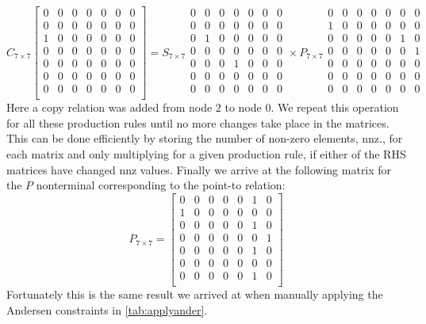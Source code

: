 \[
    C_{7\times 7}
    \begin{bmatrix}
        0 & 0 & 0 & 0 & 0 & 0 & 0 \\
        0 & 0 & 0 & 0 & 0 & 0 & 0 \\
        1 & 0 & 0 & 0 & 0 & 0 & 0 \\
        0 & 0 & 0 & 0 & 0 & 0 & 0 \\
        0 & 0 & 0 & 0 & 0 & 0 & 0 \\
        0 & 0 & 0 & 0 & 0 & 0 & 0 \\
        0 & 0 & 0 & 0 & 0 & 0 & 0 \\
    \end{bmatrix}
    =
    S_{7\times 7}
    \begin{smallmatrix}
        0 & 0 & 0 & 0 & 0 & 0 & 0 \\
        0 & 0 & 0 & 0 & 0 & 0 & 0 \\
        0 & 1 & 0 & 0 & 0 & 0 & 0 \\
        0 & 0 & 0 & 0 & 0 & 0 & 0 \\
        0 & 0 & 0 & 1 & 0 & 0 & 0 \\
        0 & 0 & 0 & 0 & 0 & 0 & 0 \\
        0 & 0 & 0 & 0 & 0 & 0 & 0 \\
    \end{smallmatrix}
    \times
    P_{7\times 7}
    \begin{smallmatrix}
        0 & 0 & 0 & 0 & 0 & 0 & 0 \\
        1 & 0 & 0 & 0 & 0 & 0 & 0 \\
        0 & 0 & 0 & 0 & 0 & 1 & 0 \\
        0 & 0 & 0 & 0 & 0 & 0 & 1 \\
        0 & 0 & 0 & 0 & 0 & 0 & 0 \\
        0 & 0 & 0 & 0 & 0 & 0 & 0 \\
        0 & 0 & 0 & 0 & 0 & 0 & 0 \\
    \end{smallmatrix}
\]
Here a copy relation was added from node $2$ to node $0$.
We repeat this operation for all these production rules until no more changes take place in the matrices.
This can be done efficiently by storing the number of non-zero elements, nnz., for each matrix and only multiplying for a given production rule, if either of the RHS matrices have changed nnz values.
Finally we arrive at the following matrix for the $P$ nonterminal corresponding to the point-to relation:
\[
    P_{7\times 7} =
    \begin{bmatrix}
        0 & 0 & 0 & 0 & 0 & 1 & 0 \\
        1 & 0 & 0 & 0 & 0 & 0 & 0 \\
        0 & 0 & 0 & 0 & 0 & 1 & 0 \\
        0 & 0 & 0 & 0 & 0 & 0 & 1 \\
        0 & 0 & 0 & 0 & 0 & 1 & 0 \\
        0 & 0 & 0 & 0 & 0 & 0 & 0 \\
        0 & 0 & 0 & 0 & 0 & 1 & 0 \\
    \end{bmatrix}
\]
Fortunately this is the same result we arrived at when manually applying the Andersen constraints in \autoref{tab:applyander}.

